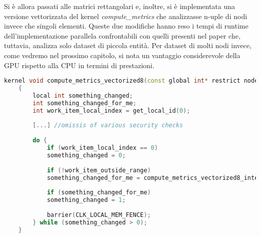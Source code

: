 Si è allora passati alle matrici rettangolari e, inoltre, si è implementata una versione vettorizzata del kernel \textit{compute\_metrics} che analizzasse n-uple di nodi invece che singoli elementi.
Queste due modifiche hanno reso i tempi di runtime dell'implementazione parallela confrontabili con quelli presenti nel paper\cite{ilavarasan2007low} che, tuttavia, analizza solo dataset di piccola entità.
Per dataset di molti nodi invece, come vedremo nel prossimo capitolo, si nota un vantaggio considerevole della GPU rispetto alla CPU in termini di prestazioni.\\

\begin{lstlisting}[language=C++, caption={compute\_metrics\_vectorized8 kernel},captionpos=b]
	kernel void compute_metrics_vectorized8(const global int* restrict nodes, global int8* restrict queue_, const int n_nodes, const global edge_t* restrict edges, const global edge_t* restrict edges_reverse, const global edge_t* restrict edges_weights, global metrics_tt* metriche, const int max_adj_dept, const int max_adj_reverse_dept)
	{
		local int something_changed;
		int something_changed_for_me;
		int work_item_local_index = get_local_id(0);
		
		[...] //omissis of various security checks
		
		do {
			if (work_item_local_index == 0)
			something_changed = 0;
			
			if (!work_item_outside_range)
			something_changed_for_me = compute_metrics_vectorized8_internal(nodes, queue_, n_nodes, edges, edges_reverse, edges_weights, metriche, max_adj_dept, max_adj_reverse_dept);
			
			if (something_changed_for_me)
			something_changed = 1;
			
			barrier(CLK_LOCAL_MEM_FENCE);
		} while (something_changed > 0);
	}
\end{lstlisting}
\newpage
